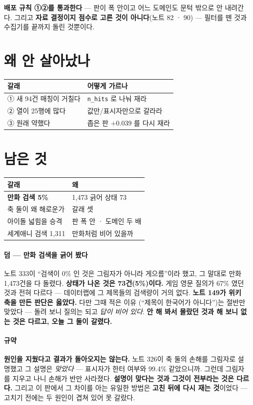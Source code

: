 \documentclass[10pt]{article}
\begin{document}
\textbf{배포 규칙 ①②를 통과한다} --- 판이 폭 안이고 어느 도메인도
문턱 밖으로 안 내려간다. 그리고 \textbf{자료 결정이지 점수로 고른 것이
아니다}(노트 82 · 90) --- 필터를 뗀 것과 수집기를 끝까지 돌린 것뿐이다.

\section{왜 안 살아났나}

\begin{center}\footnotesize
\begin{tabular}{ll}
\hline
갈래 & 어떻게 가르나 \\
\hline
① 새 94건 매칭이 거칠다 & \texttt{n\_hits} 로 나눠 재라 \\
② 열이 25행에 많다 & 값만/표시자만으로 갈라라 \\
③ 원래 약했다 & 좁은 판 $+$0.039 를 다시 재라 \\
\hline
\end{tabular}
\end{center}

\section{남은 것}
\begin{center}\footnotesize
\begin{tabular}{ll}
\hline
갈래 & 왜 \\
\hline
\textbf{만화 검색 5\%} & 1,473 긁어 상태 73 \\
축 둘이 왜 해로운가 & 갈래 셋 \\
아이돌 넓힘을 승격 & 판 폭 안 · 도메인 두 배 \\
세계애니 검색 1,311 & 만화처럼 비어 있을까 \\
\hline
\end{tabular}
\end{center}

\paragraph{덤 --- 만화 검색을 긁어 봤다} 노트 333이 ``검색이 0\% 인 것은
그림자가 아니라 게으름''이라 했고, 그 말대로 만화 1,473건을 다 돌렸다.
\textbf{상태가 나온 것은 73건(5\%)이다.} 게임 영문 질의가 67\% 였던 것과
전혀 다르다 --- 데이터랩에 그 제목들의 검색량이 거의 없다.
\textbf{노트 149가 위키 축을 만든 판단은 옳았다.} 다만 그때 적은 이유
(``제목이 한국어가 아니다'')는 절반만 맞았다 --- 돌려 보니 질의는 되고
\emph{답이 비어 있다}. \textbf{안 해 봐서 몰랐던 것과 해 보니 없는 것은
다르고, 오늘 그 둘이 갈렸다.}

\paragraph{규약} \textbf{원인을 지웠다고 결과가 돌아오지는 않는다.} 노트
326이 축 둘의 손해를 그림자로 설명했고 그 설명은 \emph{맞았다} --- 표시자가
한터 여부와 99.4\% 같았으니까. 그런데 그림자를 지우고 나니 손해가 반만
사라졌다. \textbf{설명이 맞다는 것과 그것이 전부라는 것은 다르다.}
그리고 이 판에서 그 차이를 아는 유일한 방법은 \textbf{고친 뒤에 다시
재는 것}이었다 --- 고치기 전에는 두 원인이 겹쳐 있어 못 갈랐다.
\end{document}

